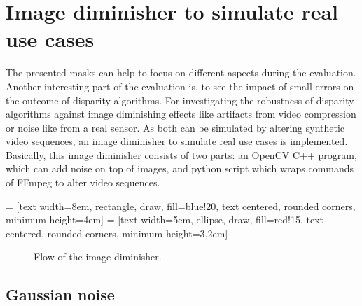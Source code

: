 \section{Image diminisher to simulate real use cases}

The presented masks can help to focus on different aspects during the evaluation.
Another interesting part of the evaluation is, to see the impact of small errors on the outcome of disparity algorithms.
For investigating the robustness of disparity algorithms against image diminishing effects like artifacts from video compression or noise like from a real sensor.
As both can be simulated by altering synthetic video sequences, an image diminisher to simulate real use cases is implemented.
Basically, this image diminisher consists of two parts: an OpenCV C++ program, which can add noise on top of images, and python script which wraps commands of FFmpeg to alter video sequences.

 = [text width=8em, rectangle, draw, fill=blue!20, text centered, rounded corners, minimum height=4em]
 = [text width=5em, ellipse, draw, fill=red!15, text centered, rounded corners, minimum height=3.2em]
\begin{figure}[h!]
  \vspace{1cm}
  \centering
  \caption{Flow of the image diminisher.}
  \label{fig:image-diminisher-flow}
\end{figure}

\subsection*{Gaussian noise}

